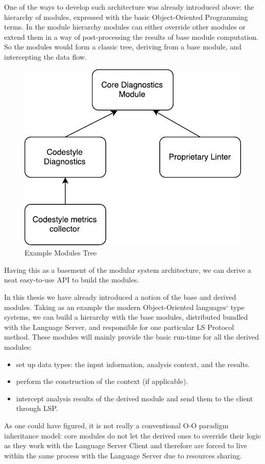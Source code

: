 One of the ways to develop such architecture was already introduced above: the hierarchy of modules, 
expressed with the basic Object-Oriented Programming terms. In the module hierarchy
modules can either override other modules or extend them in a way of post-processing the
results of base module computation. So the modules would form a classic tree, deriving from a base module,
and intercepting the data flow.

\begin{figure}[H]
    \centering
    \includegraphics[width=.5\textwidth]{figs/module_tree.pdf}
    \caption{Example Modules Tree}
\end{figure}

Having this as a basement of the modular system architecture, we can derive a 
neat easy-to-use API to build the modules.

In this thesis we have already introduced a notion of the base and derived modules. Taking as an example the modern Object-Oriented languages` 
type systems, we can build a hierarchy with the base modules, distributed bundled with the Language Server, and responsible for
one particular LS Protocol method. These modules will mainly provide the basic run-time for all the derived modules: 
\begin{itemize}
    \item set up data types: the input information, analysis context, and the results.  
    \item perform the construction of the context (if applicable).
    \item intercept analysis results of the derived module and send them to the client through LSP.
\end{itemize}

As one could have figured, it is not really a conventional O-O paradigm inheritance model: core modules do not let 
the derived ones to override their logic as they work with the Language Server Client and therefore
are forced to live within the same process with the Language Server due to resources sharing. 

